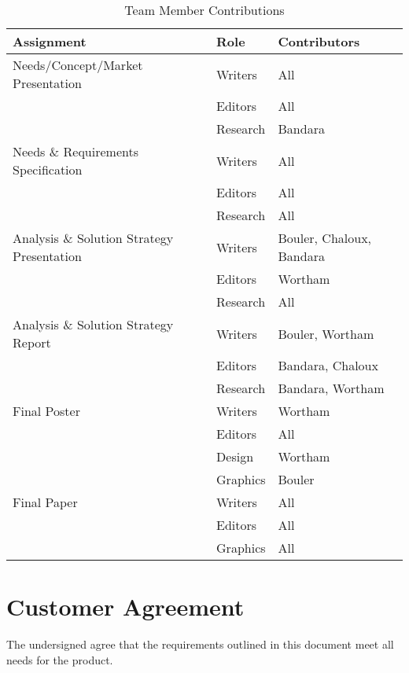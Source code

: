 \documentclass[11pt,letterpaper]{article}
\begin{document}
\begin{table}[h!]
\begin{center}
\begin{tabular}{|l|l|l|}
\hline
\textbf{Assignment} & \textbf{Role} & \textbf{Contributors} \\
\hline

Needs/Concept/Market Presentation & Writers & All \\
\cline{2-3}
& Editors  & All \\
\cline{2-3}
& Research  & Bandara \\
\hline

Needs \& Requirements Specification & Writers & All \\
\cline{2-3}
& Editors  & All \\
\cline{2-3}
& Research  & All \\
\hline

Analysis \& Solution Strategy Presentation & Writers & Bouler, Chaloux, Bandara \\
\cline{2-3}
& Editors  & Wortham \\
\cline{2-3}
& Research  & All \\
\hline

Analysis \& Solution Strategy Report & Writers & Bouler, Wortham \\
\cline{2-3}
& Editors  & Bandara, Chaloux \\
\cline{2-3}
& Research  & Bandara, Wortham \\
\hline

Final Poster & Writers & Wortham \\
\cline{2-3}
& Editors  & All \\
\cline{2-3}
& Design	& Wortham \\
\cline{2-3}
& Graphics	& Bouler \\
\hline

Final Paper & Writers & All \\
\cline{2-3}
& Editors  & All \\
\cline{2-3}
& Graphics	& All \\
\hline
\end{tabular}
\caption{Team Member Contributions}
\end{center}
\end{table}

\clearpage
\section{Customer Agreement}


The undersigned agree that the requirements outlined in this document meet all needs for the product.


\end{document}
